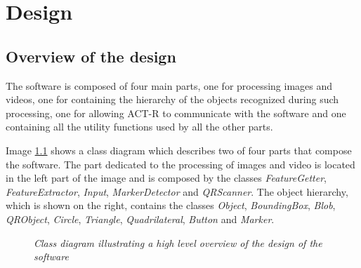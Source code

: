 \chapter{Design}

	\section{Overview of the design}
	The software is composed of four main parts, one for processing images and videos, one for containing the hierarchy of the objects recognized during such processing, one for allowing ACT-R to communicate with the software and one containing all the utility functions used by all the other parts.
		
	Image \ref{fig:swArchitecture} shows a class diagram which describes two of four parts that compose the software. 
	The part dedicated to the processing of images and video is located in the left part of the image and is composed by the classes \emph{FeatureGetter}, \emph{FeatureExtractor}, \emph{Input}, \emph{MarkerDetector} and \emph{QRScanner}.
	The object hierarchy, which is shown on the right, contains the classes \emph{Object}, \emph{BoundingBox}, \emph{Blob}, \emph{QRObject}, \emph{Circle}, \emph{Triangle}, \emph{Quadrilateral}, \emph{Button} and \emph{Marker}.

	\begin{figure}[h]
	  \begin{center} 
	  \end{center} 
	  \caption{\textit{Class diagram illustrating a high level overview of the design of the software }}  
	  \label{fig:swArchitecture}
 	\end{figure}

